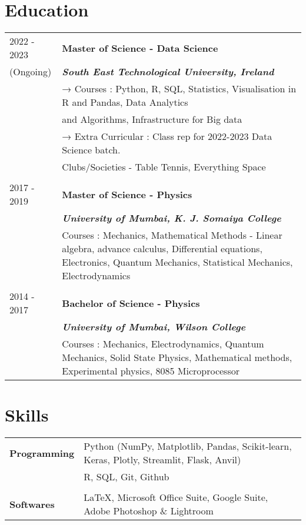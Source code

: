 \documentclass[a4paper,12pt]{article}
\begin{document}
\section{Education}
\begin{tabularx}{\linewidth}{@{}l X@{}}	
	2022 - 2023 & \textbf{Master of Science - Data Science} \\ %
	 (Ongoing) & \textbf{\textit{South East Technological University, Ireland}} \\
	 & → Courses : Python, R, SQL, Statistics, Visualisation in R and Pandas, Data Analytics \\
	 & \hspace{.4cm} and Algorithms, Infrastructure for Big data \\
	 & → Extra Curricular : Class rep for 2022-2023 Data Science batch. \\ 
	 & \hspace{.4cm} Clubs/Societies - Table Tennis, Everything Space\\
	\\
	2017 - 2019 & \textbf{Master of Science - Physics} \\ %
	 & \textbf{\textit{University of Mumbai, K. J. Somaiya College}}\\
	 & Courses : Mechanics, Mathematical Methods - Linear algebra, advance calculus, Differential equations, Electronics, Quantum Mechanics, Statistical Mechanics, Electrodynamics \\
	 \\
	2014 - 2017 &  \textbf{Bachelor of Science - Physics}\\
	& \textbf{\textit{University of Mumbai, Wilson College}}\\
	& Courses : Mechanics, Electrodynamics, Quantum Mechanics, Solid State Physics, Mathematical methods, Experimental physics, 8085 Microprocessor \\
	
\end{tabularx}

\section{Skills}
\begin{tabularx}{\linewidth}{@{}l X@{}}
	\textbf{Programming} &  \normalsize{Python (NumPy, Matplotlib, Pandas, Scikit-learn, Keras, Plotly, Streamlit, Flask, Anvil)} \\
	& R, SQL, Git, Github\\
	&\\
	\textbf{Softwares}  &  \normalsize{\LaTeX, Microsoft Office Suite, Google Suite, Adobe Photoshop \& Lightroom}\\  
\end{tabularx}
\end{document}
